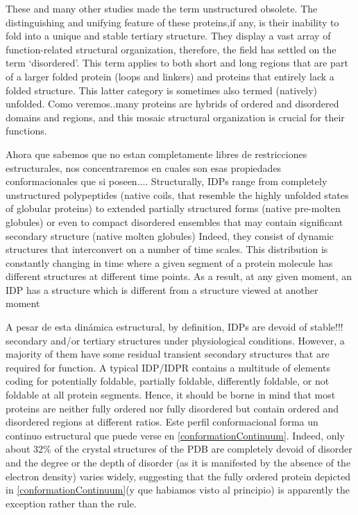 These and many other studies made the term unstructured obsolete. 
The distinguishing and unifying feature of these proteins,if any, is their inability to fold into a unique and stable tertiary structure.
They display a vast array of function-related structural organization, therefore, the field has settled on the term ‘disordered’. 
This term applies to both short and long regions that are part of a larger folded protein (loops and linkers) and proteins that entirely lack a folded structure. 
This latter category is sometimes also termed (natively) unfolded. 
Como veremos..many proteins are hybrids of ordered and disordered domains and regions, and this mosaic structural organization is crucial for their functions.





Ahora que sabemos que no estan completamente libres de restricciones estructurales, nos concentraremos en cuales son esas propiedades conformacionales que si poseen....
Structurally, IDPs range from completely unstructured polypeptides (native coils, that resemble the highly unfolded states of globular proteins) 
to extended partially structured forms (native pre-molten globules) or even to compact disordered ensembles that may contain significant secondary structure (native molten globules)
Indeed, they consist of dynamic structures that interconvert on a number of time scales.
This distribution is constantly changing in time where a given segment of a protein molecule has different structures at different time points. 
As a result, at any given moment, an IDP has a structure which is different from a structure viewed at another moment


A pesar de esta dinámica estructural, by definition, IDPs are devoid of stable!!! secondary and/or tertiary structures under physiological conditions.
However, a majority of them have some residual transient secondary structures that are required for function.
A typical IDP/IDPR contains a multitude of elements coding for potentially foldable, partially foldable, differently foldable, or not foldable at all protein segments.
Hence, it should be borne in mind that most proteins are neither fully ordered nor fully disordered but contain ordered and disordered regions at different ratios.
Este perfil conformacional forma un continuo estructural que puede verse en \ref{conformationContinuum}.
Indeed, only about 32\% of the crystal structures of the PDB are completely devoid of disorder and the degree or the depth of disorder (as it is manifested by the absence of the electron density) varies widely, 
suggesting that the fully ordered protein depicted in \ref{conformationContinuum}(y que habiamos visto al principio) is apparently the exception rather than the rule.


